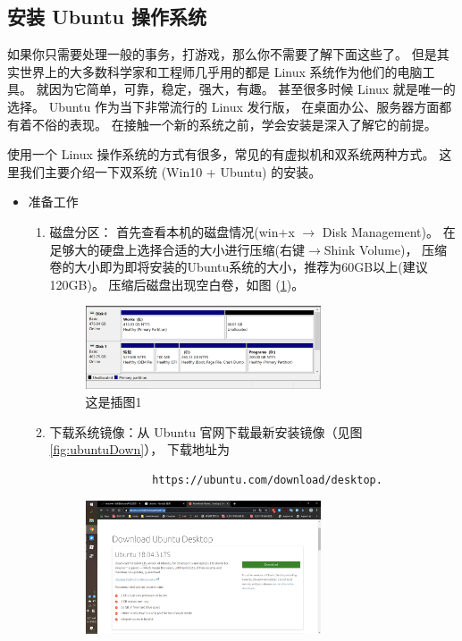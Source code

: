 \subsection{安装 Ubuntu 操作系统}

如果你只需要处理一般的事务，打游戏，那么你不需要了解下面这些了。
但是其实世界上的大多数科学家和工程师几乎用的都是 Linux 系统作为他们的电脑工具。
就因为它简单，可靠，稳定，强大，有趣。
甚至很多时候 Linux 就是唯一的选择。
Ubuntu 作为当下非常流行的 Linux 发行版，
在桌面办公、服务器方面都有着不俗的表现。
在接触一个新的系统之前，学会安装是深入了解它的前提。

使用一个 Linux 操作系统的方式有很多，常见的有虚拟机和双系统两种方式。
这里我们主要介绍一下双系统 (Win10 + Ubuntu) 的安装。

\begin{itemize}
	\item 准备工作
		\begin{enumerate}
			\item 磁盘分区：
			    首先查看本机的磁盘情况(win+x $\to$ Disk Management)。
				在足够大的硬盘上选择合适的大小进行压缩(右键$\to$Shink Volume)，
				压缩卷的大小即为即将安装的Ubuntu系统的大小，推荐为60GB以上(建议120GB)。
				压缩后磁盘出现空白卷，如图 (\ref{fig:shrinkVol})。
				\begin{figure}[htbp]
					\centering
					\includegraphics[width=0.7\textwidth]{png/shrinkVol}
					\caption{这是插图1}
					\label{fig:shrinkVol}
				\end{figure}
			\item 下载系统镜像：从 Ubuntu 官网下载最新安装镜像（见图\ref{fig:ubuntuDown}），
				下载地址为
				\begin{verbatim}
				https://ubuntu.com/download/desktop.
				\end{verbatim}
				\begin{figure}[htbp]
					\centering
					\includegraphics[width=0.7\textwidth]{png/ubuntuDown}

\end{figure}
\end{enumerate}
\end{itemize}
